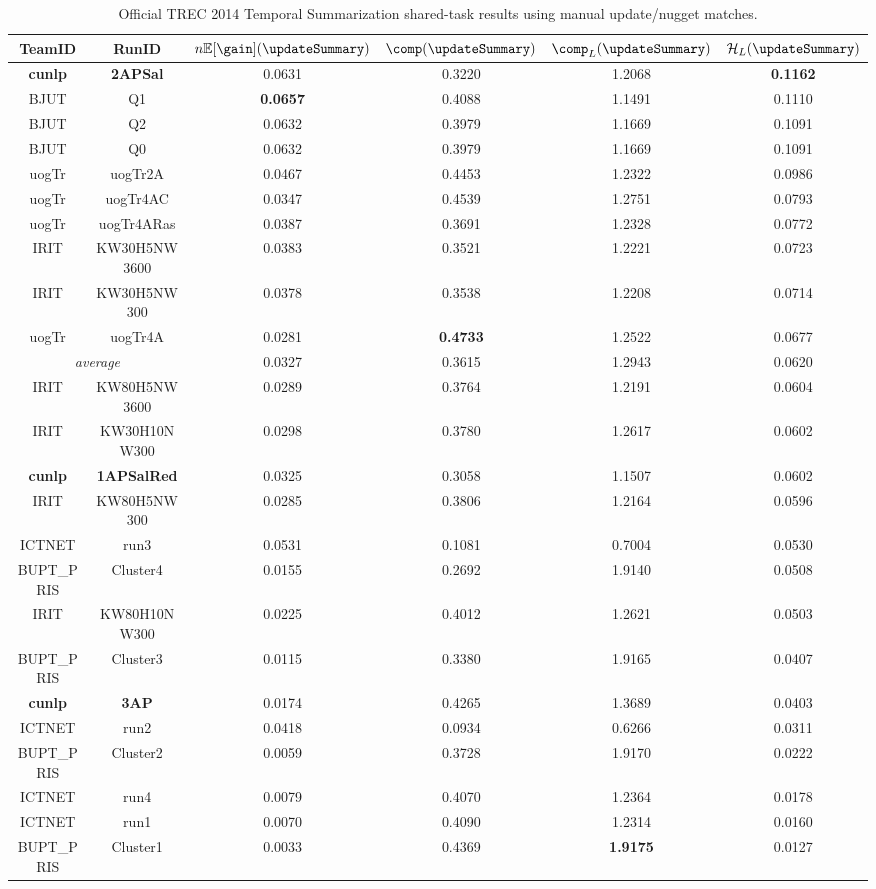 \begin{table}[t]
\centering
\begin{tabular}{cccccc}
\toprule
TeamID & RunID &$n\mathbb{E}[\gain](\updateSummary)$ & $\comp(\updateSummary)$ & $\comp_L(\updateSummary)$ & $\mathcal{H}_L(\updateSummary)$ \\
\midrule
\textbf{cunlp} & \textbf{2APSal} & 0.0631 & 0.3220 & 1.2068 & \textbf{0.1162} \\
BJUT & Q1 & \textbf{0.0657} & 0.4088 & 1.1491 & 0.1110\\
BJUT & Q2 & 0.0632 & 0.3979 & 1.1669 & 0.1091\\
BJUT & Q0 & 0.0632 & 0.3979 & 1.1669 & 0.1091\\
uogTr & uogTr2A & 0.0467 & 0.4453 & 1.2322 & 0.0986\\
uogTr & uogTr4AC & 0.0347 & 0.4539 & 1.2751 & 0.0793\\
uogTr & uogTr4ARas & 0.0387 & 0.3691 & 1.2328 & 0.0772\\
IRIT & KW30H5NW3600 & 0.0383 & 0.3521 & 1.2221 & 0.0723\\
IRIT & KW30H5NW300 & 0.0378 & 0.3538 & 1.2208 & 0.0714\\
uogTr & uogTr4A & 0.0281 & \textbf{0.4733} & 1.2522 & 0.0677\\
\midrule
\multicolumn{2}{c}{\textit{average}} & 0.0327 & 0.3615 & 1.2943 & 0.0620\\
\midrule
IRIT & KW80H5NW3600 & 0.0289 & 0.3764 & 1.2191 & 0.0604\\
IRIT & KW30H10NW300 & 0.0298 & 0.3780 & 1.2617 & 0.0602\\
\textbf{cunlp} & \textbf{1APSalRed} & 0.0325 & 0.3058 & 1.1507 & 0.0602\\
IRIT & KW80H5NW300 & 0.0285 & 0.3806 & 1.2164 & 0.0596\\
ICTNET & run3 & 0.0531 & 0.1081 & 0.7004 & 0.0530\\
BUPT\_PRIS & Cluster4 & 0.0155 & 0.2692 & 1.9140 & 0.0508\\
IRIT & KW80H10NW300 & 0.0225 & 0.4012 & 1.2621 & 0.0503\\
BUPT\_PRIS & Cluster3 & 0.0115 & 0.3380 & 1.9165 & 0.0407\\
\textbf{cunlp} & \textbf{3AP} & 0.0174 & 0.4265 & 1.3689 & 0.0403\\
ICTNET & run2 & 0.0418 & 0.0934 & 0.6266 & 0.0311\\
BUPT\_PRIS & Cluster2 & 0.0059 & 0.3728 & 1.9170 & 0.0222\\
ICTNET & run4 & 0.0079 & 0.4070 & 1.2364 & 0.0178\\
ICTNET & run1 & 0.0070 & 0.4090 & 1.2314 & 0.0160\\
BUPT\_PRIS & Cluster1 & 0.0033 & 0.4369 & \textbf{1.9175} & 0.0127\\
\bottomrule
\end{tabular}
\caption{Official TREC 2014 Temporal Summarization shared-task results using
manual update/nugget matches.}
\label{tab:trec2014}
\end{table}
